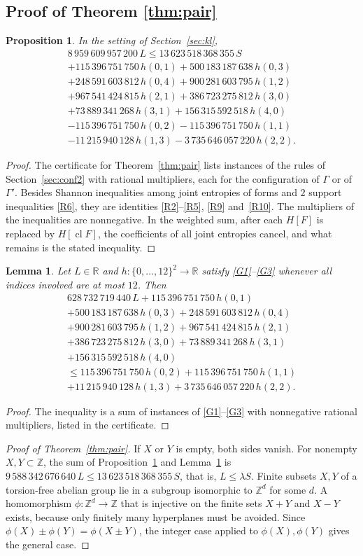 \documentclass[11pt]{amsart}
\newtheorem{lemma}[theorem]{Lemma}
\newtheorem{proposition}[theorem]{Proposition}
\theoremstyle{definition}
\theoremstyle{remark}
\numberwithin{equation}{section}
\newcommand{\R}{\mathbb{R}}
\newcommand{\Z}{\mathbb{Z}}
\newcommand{\cl}{\operatorname{cl}}
\newcommand{\LmBsum}{2}
\newcommand{\LmDepth}{12}
\newcommand{\LmDispA}{8\,959\,609\,957\,200\,L\le 13\,623\,518\,368\,355\,S\\
+115\,396\,751\,750\,h(0,1)+500\,183\,187\,638\,h(0,3)\\
+248\,591\,603\,812\,h(0,4)+900\,281\,603\,795\,h(1,2)\\
+967\,541\,424\,815\,h(2,1)+386\,723\,275\,812\,h(3,0)\\
+73\,889\,341\,268\,h(3,1)+156\,315\,592\,518\,h(4,0)\\
-115\,396\,751\,750\,h(0,2)-115\,396\,751\,750\,h(1,1)\\
-11\,215\,940\,128\,h(1,3)-3\,735\,646\,057\,220\,h(2,2)}
\newcommand{\LmDispB}{628\,732\,719\,440\,L+115\,396\,751\,750\,h(0,1)\\
+500\,183\,187\,638\,h(0,3)+248\,591\,603\,812\,h(0,4)\\
+900\,281\,603\,795\,h(1,2)+967\,541\,424\,815\,h(2,1)\\
+386\,723\,275\,812\,h(3,0)+73\,889\,341\,268\,h(3,1)\\
+156\,315\,592\,518\,h(4,0)\\
\le 115\,396\,751\,750\,h(0,2)+115\,396\,751\,750\,h(1,1)\\
+11\,215\,940\,128\,h(1,3)+3\,735\,646\,057\,220\,h(2,2)}
\newcommand{\LmABsumL}{9\,588\,342\,676\,640}
\newcommand{\LmAS}{13\,623\,518\,368\,355}
\begin{document}
\subsection{Proof of Theorem \ref{thm:pair}}

\begin{proposition}\label{prop:config}
In the setting of Section~\ref{sec:kl},
\begin{multline*}
\LmDispA.
\end{multline*}
\end{proposition}

\begin{proof}
The certificate for Theorem~\ref{thm:pair} \cite{Cert} lists instances of the rules of Section~\ref{sec:conf2} with rational multipliers, each for the configuration of $\Gamma$ or of $\Gamma'$. Besides Shannon inequalities among joint entropies of forms and $\LmBsum$ support inequalities \ref{R6}, they are identities \ref{R2}--\ref{R5}, \ref{R9} and~\ref{R10}. The multipliers of the inequalities are nonnegative. In the weighted sum, after each $H[F]$ is replaced by $H[\cl F]$, the coefficients of all joint entropies cancel, and what remains is the stated inequality.
\end{proof}

\begin{lemma}\label{lem:grid}
Let $L\in\R$ and $h\colon\{0,\dots,\LmDepth\}^2\to\R$ satisfy \ref{G1}--\ref{G3} whenever all indices involved are at most $\LmDepth$. Then
\begin{multline*}
\LmDispB.
\end{multline*}
\end{lemma}

\begin{proof}
The inequality is a sum of instances of \ref{G1}--\ref{G3} with nonnegative rational multipliers, listed in the certificate.
\end{proof}

\begin{proof}[Proof of Theorem~\ref{thm:pair}]
If $X$ or $Y$ is empty, both sides vanish. For nonempty $X,Y\subset\Z$, the sum of Proposition~\ref{prop:config} and Lemma~\ref{lem:grid} is $\LmABsumL\,L\le\LmAS\,S$, that is, $L\le\lambda S$. Finite subsets $X,Y$ of a torsion-free abelian group lie in a subgroup isomorphic to $\Z^d$ for some $d$. A homomorphism $\phi\colon\Z^d\to\Z$ that is injective on the finite sets $X+Y$ and $X-Y$ exists, because only finitely many hyperplanes must be avoided. Since $\phi(X)\pm\phi(Y)=\phi(X\pm Y)$, the integer case applied to $\phi(X),\phi(Y)$ gives the general case.
\end{proof}
\end{document}

